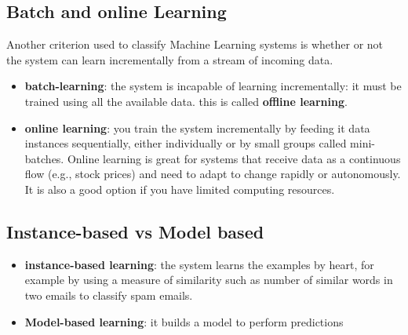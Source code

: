 \subsection{Batch and online Learning}
Another criterion used to classify Machine Learning systems is whether or not the system can learn incrementally from a stream of incoming data.
\begin{itemize}
\item \textbf{batch-learning}: the system is incapable of learning incrementally: it must be trained using all the available data. this is called \textbf{offline learning}.
\item \textbf{online learning}: you train the system incrementally by feeding it data instances sequentially, either individually or by small groups called mini-batches. Online learning is great for systems that receive data as a continuous flow (e.g., stock prices) and need to adapt to change rapidly or autonomously. It is also a good option if you have limited computing resources.
\end{itemize}

\subsection{Instance-based vs Model based}
\begin{itemize}
\item \textbf{instance-based learning}: the system learns the examples by heart, for example by using a measure of similarity such as number of similar words in two emails to classify spam emails.
\item \textbf{Model-based learning}: it builds a model to perform predictions
\end{itemize}
